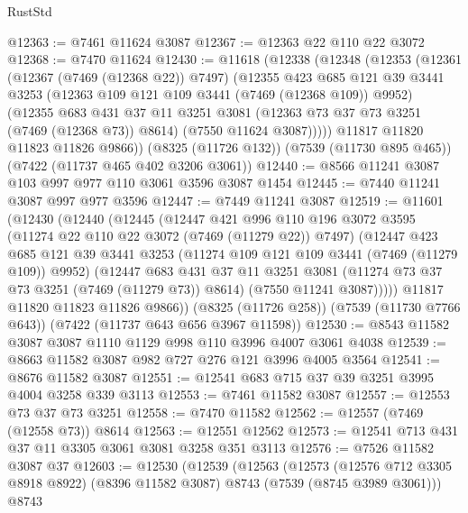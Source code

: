 \begin{lexlean}{RustStd}
\begin{coremodule}
@12363 := @7461 @11624 @3087
@12367 := @12363 @22 @110 @22 @3072
@12368 := @7470 @11624
@12430 := @11618
    (@12338
      (@12348
        (@12353
          (@12361
            (@12367 (@7469 (@12368 @22)) @7497)
            (@12355
              @423
              @685
              @121
              @39
              @3441
              @3253
              (@12363 @109 @121 @109 @3441 (@7469 (@12368 @109)) @9952)
              (@12355
                @683
                @431
                @37
                @11
                @3251
                @3081
                (@12363 @73 @37 @73 @3251 (@7469 (@12368 @73)) @8614)
                (@7550 @11624 @3087)))))
        @11817
        @11820
        @11823
        @11826
        @9866))
    (@8325 (@11726 @132))
    (@7539 (@11730 @895 @465))
    (@7422 (@11737 @465 @402 @3206 @3061))
@12440 := @8566 @11241 @3087 @103 @997 @977 @110 @3061 @3596 @3087 @1454
@12445 := @7440 @11241 @3087 @997 @977 @3596
@12447 := @7449 @11241 @3087
@12519 := @11601
    (@12430
      (@12440
        (@12445
          (@12447
            @421
            @996
            @110
            @196
            @3072
            @3595
            (@11274 @22 @110 @22 @3072 (@7469 (@11279 @22)) @7497)
            (@12447
              @423
              @685
              @121
              @39
              @3441
              @3253
              (@11274 @109 @121 @109 @3441 (@7469 (@11279 @109)) @9952)
              (@12447
                @683
                @431
                @37
                @11
                @3251
                @3081
                (@11274 @73 @37 @73 @3251 (@7469 (@11279 @73)) @8614)
                (@7550 @11241 @3087)))))
        @11817
        @11820
        @11823
        @11826
        @9866))
    (@8325 (@11726 @258))
    (@7539 (@11730 @7766 @643))
    (@7422 (@11737 @643 @656 @3967 @11598))
@12530 := @8543 @11582 @3087 @3087 @1110 @1129 @998 @110 @3996 @4007 @3061 @4038
@12539 := @8663 @11582 @3087 @982 @727 @276 @121 @3996 @4005 @3564
@12541 := @8676 @11582 @3087
@12551 := @12541 @683 @715 @37 @39 @3251 @3995 @4004 @3258 @339 @3113
@12553 := @7461 @11582 @3087
@12557 := @12553 @73 @37 @73 @3251
@12558 := @7470 @11582
@12562 := @12557 (@7469 (@12558 @73)) @8614
@12563 := @12551 @12562
@12573 := @12541 @713 @431 @37 @11 @3305 @3061 @3081 @3258 @351 @3113
@12576 := @7526 @11582 @3087 @37
@12603 := @12530
    (@12539
      (@12563
        (@12573
          (@12576 @712 @3305 @8918 @8922)
          (@8396 @11582 @3087)
          @8743
          (@7539 (@8745 @3989 @3061)))
        @8743

\end{coremodule}
\end{lexlean}
